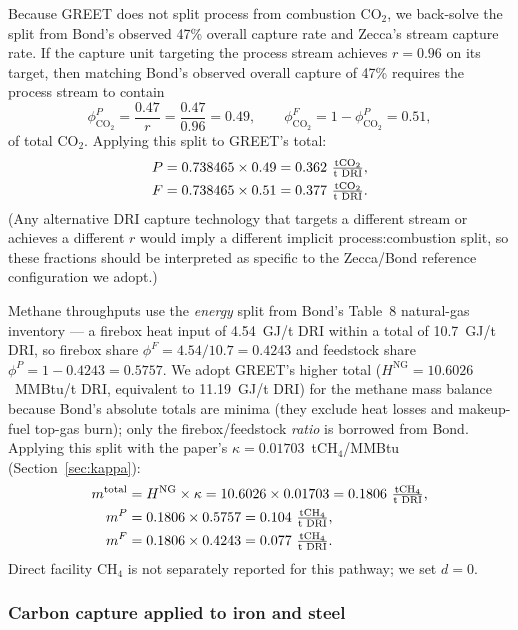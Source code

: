 \documentclass[11pt]{article}
\newcommand{\cotwo}{\ensuremath{\mathrm{CO_2}}}
\newcommand{\chfour}{\ensuremath{\mathrm{CH_4}}}
\begin{document}
Because GREET does not split process from combustion \cotwo{}, we back-solve the split from Bond's observed 47\% overall capture rate and Zecca's stream capture rate. If the capture unit targeting the process stream achieves $r = 0.96$ on its target, then matching Bond's observed overall capture of 47\% requires the process stream to contain
%
\[
  \phi_{\cotwo{}}^P = \frac{0.47}{r} = \frac{0.47}{0.96} = 0.49, \qquad \phi_{\cotwo{}}^F = 1 - \phi_{\cotwo{}}^P = 0.51,
\]
%
of total \cotwo{}. Applying this split to GREET's total:
%
\begin{align*}
  P &= 0.738465 \times 0.49 = 0.362~\tfrac{\text{t\cotwo{}}}{\text{t DRI}}, \\
  F &= 0.738465 \times 0.51 = 0.377~\tfrac{\text{t\cotwo{}}}{\text{t DRI}}.
\end{align*}
%
(Any alternative DRI capture technology that targets a different stream or achieves a different $r$ would imply a different implicit process:combustion split, so these fractions should be interpreted as specific to the Zecca/Bond reference configuration we adopt.)

Methane throughputs use the \emph{energy} split from Bond's Table~8 natural-gas inventory --- a firebox heat input of 4.54~GJ/t DRI within a total of 10.7~GJ/t DRI, so firebox share $\phi^F = 4.54/10.7 = 0.4243$ and feedstock share $\phi^P = 1 - 0.4243 = 0.5757$. We adopt GREET's higher total ($H^{\text{NG}} = 10.6026$~MMBtu/t DRI, equivalent to 11.19~GJ/t DRI) for the methane mass balance because Bond's absolute totals are minima (they exclude heat losses and makeup-fuel top-gas burn); only the firebox/feedstock \emph{ratio} is borrowed from Bond. Applying this split with the paper's $\kappa = 0.01703$~t\chfour{}/MMBtu (Section~\ref{sec:kappa}):
%
\begin{align*}
  m^{\text{total}} &= H^{\text{NG}} \times \kappa = 10.6026 \times 0.01703 = 0.1806~\tfrac{\text{t\chfour{}}}{\text{t DRI}}, \\
  m^P &= 0.1806 \times 0.5757 = 0.104~\tfrac{\text{t\chfour{}}}{\text{t DRI}}, \\
  m^F &= 0.1806 \times 0.4243 = 0.077~\tfrac{\text{t\chfour{}}}{\text{t DRI}}.
\end{align*}
%
Direct facility \chfour{} is not separately reported for this pathway; we set $d = 0$.

\subsubsection{Carbon capture applied to iron and steel}
\end{document}
